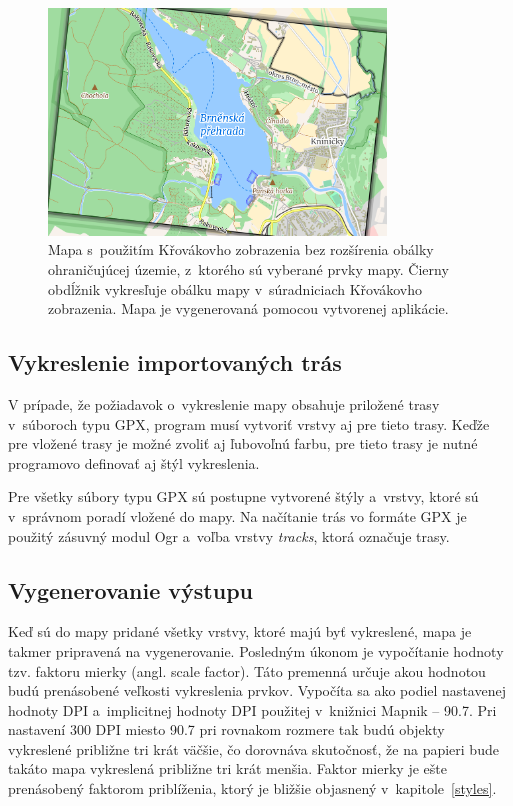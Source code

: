 \begin{figure}[hbt]
	\centering
	\includegraphics[width=0.8\textwidth]{obrazky-figures/krovak_bad.pdf}
	\caption{Mapa s~použitím Křovákovho zobrazenia bez rozšírenia obálky ohraničujúcej územie, z~ktorého sú vyberané prvky mapy. Čierny obdĺžnik vykresľuje obálku mapy v~súradniciach Křovákovho zobrazenia. Mapa je vygenerovaná pomocou vytvorenej aplikácie.}
	\label{img_krovak_pad}
\end{figure}

\subsection*{Vykreslenie importovaných trás}
V prípade, že požiadavok o~vykreslenie mapy obsahuje priložené trasy v~súboroch typu GPX, program musí vytvoriť vrstvy aj pre tieto trasy. Keďže pre vložené trasy je možné zvoliť aj ľubovoľnú farbu, pre tieto trasy je nutné programovo definovať aj štýl vykreslenia. 

Pre všetky súbory typu GPX sú postupne vytvorené štýly a~vrstvy, ktoré sú v~správnom poradí vložené do mapy. Na načítanie trás vo formáte GPX je použitý zásuvný modul Ogr a~voľba vrstvy {\it tracks}, ktorá označuje trasy. 

\subsection*{Vygenerovanie výstupu}
Keď sú do mapy pridané všetky vrstvy, ktoré majú byť vykreslené, mapa je takmer pripravená na vygenerovanie. Posledným úkonom je vypočítanie hodnoty tzv. faktoru mierky (angl. scale factor). Táto premenná určuje akou hodnotou budú prenásobené veľkosti vykreslenia prvkov. Vypočíta sa ako podiel nastavenej hodnoty DPI a~implicitnej hodnoty DPI použitej v~knižnici Mapnik -- 90.7. Pri nastavení 300 DPI miesto 90.7 pri rovnakom rozmere tak budú objekty vykreslené približne tri krát väčšie, čo dorovnáva skutočnosť, že na papieri bude takáto mapa vykreslená približne tri krát menšia. Faktor mierky je ešte prenásobený faktorom priblíženia, ktorý je bližšie objasnený v~kapitole~\ref{styles}.

